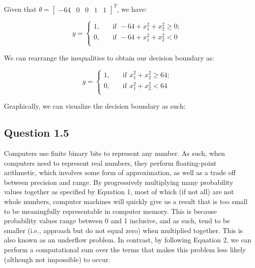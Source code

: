 \documentclass[11pt,fancychapters]{article}
\begin{document}
Given that $\theta = \begin{bmatrix}-64 & 0 & 0 & 1 & 1\end{bmatrix}^T$, we have:

\begin{equation*}
	y = \begin{cases}
		1, \quad &\text{if} \, ~ -64 + x_1^2 + x_2^2 \geq 0; \\
		0, \quad &\text{if} \, ~ -64 + x_1^2 + x_2^2 < 0 \\
	\end{cases}	
\end{equation*}

We can rearrange the inequalities to obtain our decision boundary as:

\begin{equation*}
	y = \begin{cases}
		1, \quad &\text{if} \, ~ x_1^2 + x_2^2 \geq 64; \\
		0, \quad &\text{if} \, ~ x_1^2 + x_2^2 < 64 \\
	\end{cases}	
\end{equation*}

Graphically, we can visualize the decision boundary as such:

\begin{figure}[!h]
	\centering
\end{figure}

\subsection*{Question 1.5}

Computers use finite binary bits to represent any number. As such, when computers need to represent real numbers, they perform floating-point arithmetic, which involves some form of approximation, as well as a trade off between precision and range. By progressively multiplying many probability values together as specified by Equation 1, most of which (if not all) are not whole numbers, computer machines will quickly give us a result that is too small to be meaningfully representable in computer memory. This is because probability values range between 0 and 1 inclusive, and as such, tend to be smaller (i.e., approach but do not equal zero) when multiplied together. This is also known as an underflow problem. In contrast, by following Equation 2, we can perform a computational sum over the terms that makes this problem less likely (although not impossible) to occur.
\end{document}
